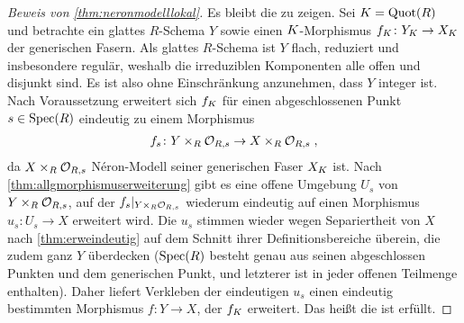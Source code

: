 \begin{proof}[Beweis von \ref{thm:neronmodelllokal}]
  Es bleibt die \NAbbEig zu zeigen.
  Sei $K=\operatorname{Quot}(R)$ und betrachte ein glattes $R$-Schema $Y$ sowie
  einen $K$-Morphismus $f_{K}\colon Y_{K}\to X_{K}$ der
  generischen Fasern.
  Als glattes $R$-Schema ist $Y$ flach, reduziert und insbesondere
  regulär, weshalb die irreduziblen Komponenten alle offen und
  disjunkt sind. Es ist also ohne Einschränkung anzunehmen, dass
  $Y$ integer ist.
  Nach Voraussetzung erweitert sich $f_{K}$ für einen abgeschlossenen
  Punkt $s\in\operatorname{Spec}(R)$ eindeutig zu einem Morphismus
  \begin{gather*}
    f_s\colon Y\times_R\mathcal{O}_{R,s}\to X\times_R\mathcal{O}_{R,s}\;,
  \end{gather*}
  da $X\times_R\mathcal{O}_{R,s}$ Néron-Modell seiner generischen Faser $X_{K}$
  ist.
  Nach \ref{thm:allgmorphismuserweiterung} gibt es eine offene
  Umgebung $U_s$ von $Y\times_R\mathcal{O}_{R,s}$, auf der
  $f_s|_{Y\times_R\mathcal{O}_{R,s}}$ wiederum
  eindeutig auf einen Morphismus $u_s\colon U_s\to X$ erweitert
  wird.
  Die $u_s$ stimmen wieder wegen Separiertheit von $X$
  nach \ref{thm:erweindeutig} auf dem Schnitt ihrer
  Definitionsbereiche überein, die zudem ganz $Y$ überdecken
  ($\operatorname{Spec}(R)$ besteht genau aus seinen
  abgeschlossen Punkten und dem generischen Punkt, und letzterer ist
  in jeder offenen Teilmenge enthalten).
  Daher liefert Verkleben der eindeutigen $u_s$ einen
  eindeutig bestimmten Morphismus $f\colon Y\to X$, der
  $f_{K}$ erweitert.
  Das heißt die \NAbbEig ist erfüllt.
\end{proof}


